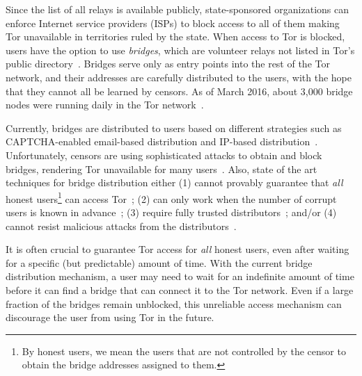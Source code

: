 \documentclass[a4paper,UKenglish]{lipics-v2016}
\begin{document}

Since the list of all relays is available publicly, state-sponsored organizations can enforce Internet service providers (ISPs) to block access to all of them making Tor unavailable in territories ruled by the state. %
When access to Tor is blocked, users have the option to use \emph{bridges}, which are volunteer relays not listed in Tor's public directory~\cite{Dingledine06designof}. Bridges serve only as entry points into the rest of the Tor network, and their addresses are carefully distributed to the users, with the hope that they cannot all be learned by censors. 
As of March 2016, about 3,000 bridge nodes were running daily in the Tor network~\cite{Tor:Bridges}.

Currently, bridges are distributed to users based on different strategies such as CAPTCHA-enabled email-based distribution and IP-based distribution~\cite{Dingledine06designof}. Unfortunately, censors are using sophisticated attacks to obtain
and block bridges, rendering Tor unavailable for many users~\cite{Dingledine:Bridges:2011,Ling:2012:infocom,BridgeBlockingChina:2012}.
Also, state of the art techniques for bridge distribution either (1) cannot provably guarantee that \emph{all} honest users\footnote{By honest users, we mean the users that are not controlled by the censor to obtain the bridge addresses assigned to them.} can access Tor~\cite{WangLBH:rBridge:13,McCoy:FC:2011,Sovran:2008:PSN}; (2) can only work when the number of corrupt users is known in advance~\cite{Mahdian:2010}; (3) require fully trusted distributors~\cite{McCoy:FC:2011,Mahdian:2010,Sovran:2008:PSN}; and/or (4) cannot resist malicious attacks from the distributors~\cite{WangLBH:rBridge:13,McCoy:FC:2011,Mahdian:2010,Sovran:2008:PSN}.

It is often crucial to guarantee Tor access for \emph{all} honest users, even after waiting for a specific (but predictable) amount of time. With the current bridge distribution mechanism, a user may need to wait for an indefinite amount of time before it can find a bridge that can connect it to the Tor network. Even if a large fraction of the bridges remain unblocked, this unreliable access mechanism can discourage the user from using Tor in the future.
\end{document}
